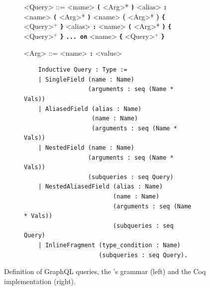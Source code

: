 \begin{figure}[h]
  \centering
  \begin{subfigure}{.5\textwidth}
    \begin{grammar}
        <Query> ::= <name> \textbf{\texttt{(}} <Arg>* \textbf{\texttt{)}}
        \alt <alias> \textbf{\texttt{:}} <name> \textbf{\texttt{(}} <Arg>* \textbf{\texttt{)}}
        \alt <name> \textbf{(} <Arg>* \textbf{)} \textbf{\texttt{\{}} <Query>$^{+}$ \textbf{\texttt{\}}}
        \alt <alias> \textbf{\texttt{:}} <name> \textbf{\texttt{(}} <Arg>* \textbf{\texttt{)}} \textbf{\texttt{\{}} <Query>$^{+}$ \textbf{\texttt{\}}}
        \alt \textbf{\texttt{... on}} <name> \textbf{\texttt{\{}} <Query>$^{+}$ \textbf{\texttt{\}}}
        
        <Arg> ::= <name> \textbf{\texttt{:}} <value>
    \end{grammar}
  \end{subfigure}%
  \begin{subfigure}{.5\textwidth}

    \begin{verbatim}
    Inductive Query : Type :=
    | SingleField (name : Name)
                  (arguments : seq (Name * Vals))
    | AliasedField (alias : Name)
                   (name : Name)
                   (arguments : seq (Name * Vals))
    | NestedField (name : Name)
                  (arguments : seq (Name * Vals))
                  (subqueries : seq Query)
    | NestedAliasedField (alias : Name)
                         (name : Name)
                         (arguments : seq (Name * Vals))
                         (subqueries : seq Query)
    | InlineFragment (type_condition : Name)
                     (subqueries : seq Query).
    \end{verbatim}
  \end{subfigure}
  \caption{Definition of GraphQL queries, the \spec{}'s grammar (left) and the Coq implementation (right).}
  \label{fig:query_def}
\end{figure}


